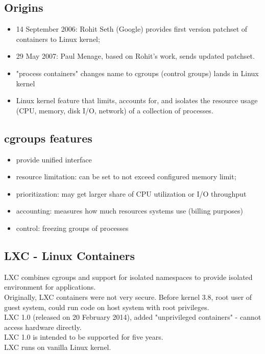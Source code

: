\documentclass{beamer}
\begin{document}
\subsection{Origins}
\begin{frame}
\begin{itemize}
\item 14 September 2006: Rohit Seth (Google) provides first version patchset of containers to Linux kernel;
\pause
\item 29 May 2007: Paul Menage, based on Rohit's work, sends updated patchset.
\pause
\item "process containers" changes name to cgroups (control groups) lands in Linux kernel
\pause
\item Linux kernel feature that limits, accounts for, and isolates the resource usage (CPU, memory, disk I/O, network) of a collection of processes.
\end{itemize}
\end{frame}

\subsection{cgroups features}
\begin{frame}
\begin{itemize}
\item provide unified interface
\pause
\item resource limitation: can be set to not exceed configured memory limit;
\pause
\item prioritization: may get larger share of CPU utilization or I/O throughput
\pause
\item accounting: measures how much resources systems use (billing purposes)
\pause
\item control: freezing groups of processes
\end{itemize}
\end{frame}

\subsection{LXC - Linux Containers}
\begin{frame}
LXC combines cgroups and support for isolated namespaces to provide isolated environment for applications. \\
\pause
Originally, LXC containers were not very secure. Before kernel 3.8, root user of guest system, could run code on host system with root privileges. \\
LXC 1.0 (released on 20 February 2014), added "unprivileged containers" - cannot access hardware directly. \\
\pause
LXC 1.0 is intended to be supported for five years. \\
\pause
LXC runs on vanilla Linux kernel.
\end{frame}
\end{document}
